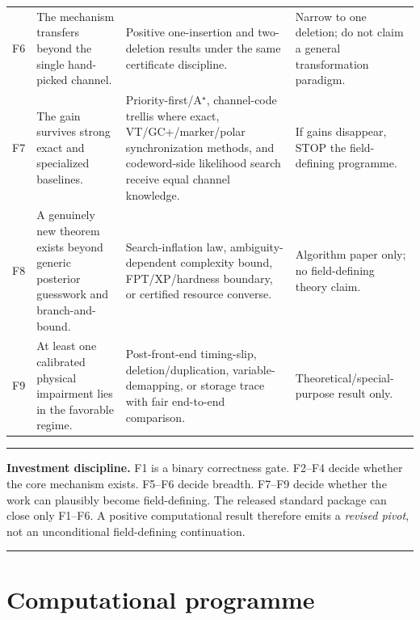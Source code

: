 \documentclass[11pt]{article}
\newenvironment{gatebox}{\begin{center}\begin{minipage}{0.94\textwidth}\color{navy}\hrule\vspace{0.5em}}{\vspace{0.5em}\hrule\end{minipage}\end{center}}
\begin{document}
\begin{longtable}{p{}p{}p{}p{}}
F6 & The mechanism transfers beyond the single hand-picked channel. & Positive one-insertion and two-deletion results under the same certificate discipline. & Narrow to one deletion; do not claim a general transformation paradigm.\\
F7 & The gain survives strong exact and specialized baselines. & Priority-first/A$^\star$, channel-code trellis where exact, VT/GC+/marker/polar synchronization methods, and codeword-side likelihood search receive equal channel knowledge. & If gains disappear, STOP the field-defining programme.\\
F8 & A genuinely new theorem exists beyond generic posterior guesswork and branch-and-bound. & Search-inflation law, ambiguity-dependent complexity bound, FPT/XP/hardness boundary, or certified resource converse. & Algorithm paper only; no field-defining theory claim.\\
F9 & At least one calibrated physical impairment lies in the favorable regime. & Post-front-end timing-slip, deletion/duplication, variable-demapping, or storage trace with fair end-to-end comparison. & Theoretical/special-purpose result only.\\
\bottomrule
\end{longtable}

\begin{gatebox}
\textbf{Investment discipline.} F1 is a binary correctness gate. F2--F4 decide whether the core mechanism exists. F5--F6 decide breadth. F7--F9 decide whether the work can plausibly become field-defining. The released standard package can close only F1--F6. A positive computational result therefore emits a \emph{revised pivot}, not an unconditional field-defining continuation.
\end{gatebox}

\section{Computational programme}
\end{document}
